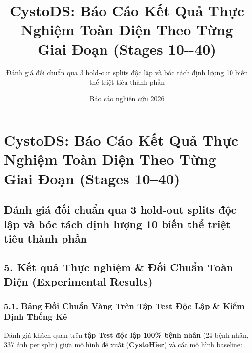 \documentclass[
  11pt,
  a4paper,
]{article}
\title{CystoDS: Báo Cáo Kết Quả Thực Nghiệm Toàn Diện Theo Từng Giai
Đoạn (Stages 10-\/-40)}
\subtitle{Đánh giá đối chuẩn qua 3 hold-out splits độc lập và bóc tách
định lượng 10 biến thể triệt tiêu thành phần}
\author{}
\date{Báo cáo nghiên cứu 2026}
\begin{document}
\maketitle

\section{CystoDS: Báo Cáo Kết Quả Thực Nghiệm Toàn Diện Theo Từng Giai
Đoạn (Stages
10--40)}\label{cystods-buxe1o-cuxe1o-kux1ebft-quux1ea3-thux1ef1c-nghiux1ec7m-touxe0n-diux1ec7n-theo-tux1eebng-giai-ux111oux1ea1n-stages-1040}

\subsection{Đánh giá đối chuẩn qua 3 hold-out splits độc lập và bóc tách
định lượng 10 biến thể triệt tiêu thành
phần}\label{ux111uxe1nh-giuxe1-ux111ux1ed1i-chuux1ea9n-qua-3-hold-out-splits-ux111ux1ed9c-lux1eadp-vuxe0-buxf3c-tuxe1ch-ux111ux1ecbnh-lux1b0ux1ee3ng-10-biux1ebfn-thux1ec3-triux1ec7t-tiuxeau-thuxe0nh-phux1ea7n}

\subsection{5. Kết quả Thực nghiệm \& Đối Chuẩn Toàn Diện (Experimental
Results)}\label{kux1ebft-quux1ea3-thux1ef1c-nghiux1ec7m-ux111ux1ed1i-chuux1ea9n-touxe0n-diux1ec7n-experimental-results}

\subsubsection{5.1. Bảng Đối Chuẩn Vàng Trên Tập Test Độc Lập \& Kiểm
Định Thống
Kê}\label{bux1ea3ng-ux111ux1ed1i-chuux1ea9n-vuxe0ng-truxean-tux1eadp-test-ux111ux1ed9c-lux1eadp-kiux1ec3m-ux111ux1ecbnh-thux1ed1ng-kuxea}

Đánh giá khách quan trên \textbf{tập Test độc lập 100\% bệnh nhân} (24
bệnh nhân, 337 ảnh per split) giữa mô hình đề xuất (\textbf{CystoHier})
và các mô hình baseline:
\end{document}
